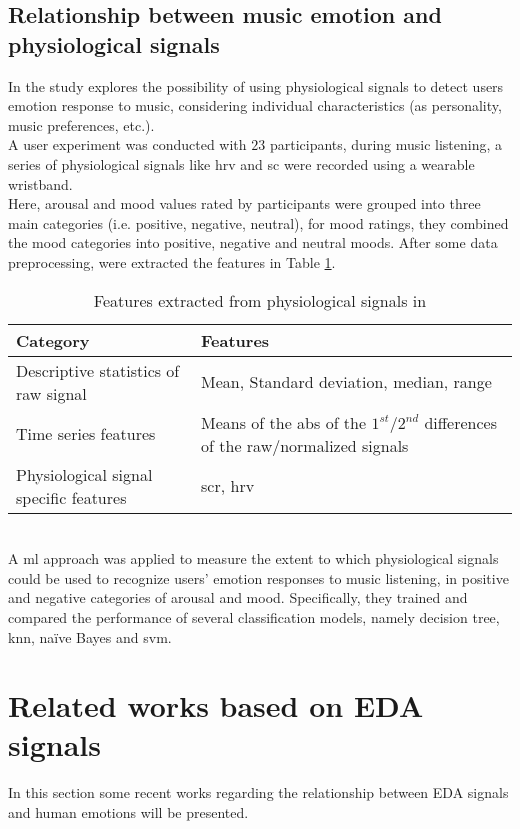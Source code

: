 \subsection{Relationship between music emotion and physiological signals}
In \cite{hu2018relationships} the study explores the possibility of using physiological signals to detect users emotion response to music, considering individual characteristics (as personality, music preferences, etc.).
\\ \indent
A user experiment was conducted with $23$ participants, during music listening, a series of physiological signals like \gls{hrv} and \gls{sc} were recorded using a wearable wristband.
\\ Here, arousal and mood values rated by participants were grouped into three main categories (i.e. positive, negative, neutral), for mood ratings, they combined the mood categories into positive, negative and neutral moods.
\newpage
After some data preprocessing, were extracted the features in Table \ref{table:features_hu2018}.
\begin{table}[h!]
	\centering
	\begin{tabular}{|p{}|p{}|}
		\hline
		Category & Features\\ [0.5ex] 
		\hline \hline Descriptive statistics of raw signal & Mean, Standard deviation, median, range \\
		\hline Time series features & Means of the abs of the $1^{st}$/$2^{nd}$ differences of the raw/normalized signals \\
		\hline Physiological signal specific features & \gls{scr}, \gls{hrv} \\
		\hline
	\end{tabular}
	\caption{Features extracted from physiological signals in \cite{hu2018relationships}}
	\label{table:features_hu2018}
\end{table}
\\
A \gls{ml} approach was applied to measure the extent to which physiological signals could be used to recognize users’ emotion responses to music listening, in positive and negative categories of arousal and mood. Specifically, they trained and compared the performance of several classification models, namely decision tree, \gls{knn}, naïve Bayes and \gls{svm}.

\newpage
\section{Related works based on EDA signals}
In this section some recent works regarding the relationship between EDA signals and human emotions will be presented. 

